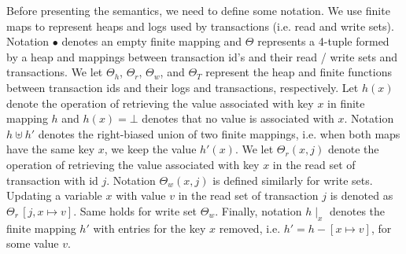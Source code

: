 \documentclass{fundam}
\begin{document}


Before presenting the semantics, we need to define some notation.
We use finite maps to  represent heaps and logs used by transactions (i.e. read and write
sets). Notation $\bullet$ denotes an empty finite mapping and
$\Theta$ represents a 4-tuple formed by a heap and mappings between transaction id's and their
read / write sets and transactions. We let $\Theta_h$, $\Theta_r$, $\Theta_w$, and $\Theta_T$ represent the heap and finite
functions between transaction ids and their logs and transactions,
respectively. Let $h(x)$ denote the operation
of retrieving the value associated with key $x$ in finite mapping 
$h$ and $h(x)=\bot$ denotes that no value is associated
with $x$. Notation $h \uplus h'$ denotes the right-biased union of 
two finite mappings, i.e. when both maps have the same key $x$, we keep
the value $h'(x)$. We let $\Theta_r(x,j)$ denote the operation of
retrieving the value associated with key $x$ in the read set of transaction
with id $j$. Notation $\Theta_w(x,j)$ is defined similarly for write sets. Updating
a variable $x$ with value $v$ in the read set of transaction $j$ is denoted as
$\Theta_r\,[j,x\mapsto v]$. Same holds for write set $\Theta_w$.
Finally, notation $h\mid_{x}$ denotes the finite mapping $h'$ with entries for the key $x$
removed, i.e. $h' = h - [ x \mapsto v]$, for some value $v$.
\end{document}
